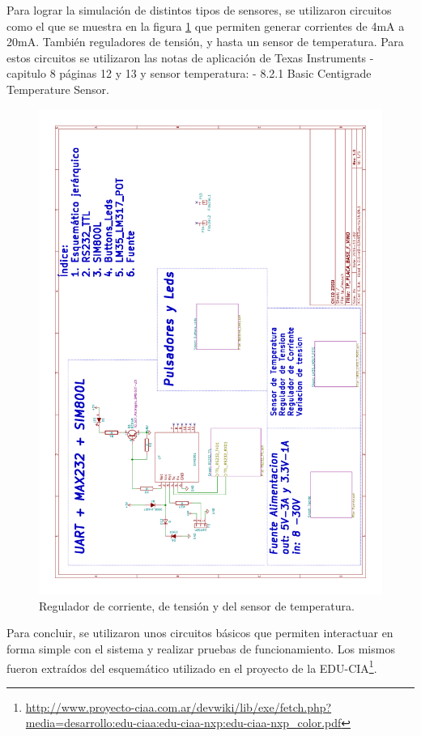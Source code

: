 Para lograr la simulación de distintos tipos de sensores, se utilizaron circuitos como el que se muestra en la figura \ref{fig:temp_tens}  que permiten generar corrientes de 4mA a 20mA. También reguladores de tensión, y hasta un sensor de temperatura. Para estos circuitos se utilizaron las notas de aplicación de Texas Instruments\citep{Texas:LM317} - capitulo 8 páginas 12 y 13 y sensor temperatura: \citep{Texas:LM35} - 8.2.1 Basic Centigrade Temperature Sensor. 
\begin{figure}[!hp]
  \centering
  \includegraphics[page=4,scale=0.6,angle=270,clip,trim=1cm 2cm 3.5cm 2.5cm]{./Figures/schematic.pdf}
  \caption{Regulador de corriente, de tensión y del sensor de temperatura.}
  \label{fig:temp_tens}
\end{figure}

Para concluir, se utilizaron unos circuitos básicos que permiten interactuar en forma simple con el sistema y realizar pruebas de funcionamiento. Los mismos fueron extraídos del esquemático utilizado en el proyecto de la EDU-CIA\footnote{\url{http://www.proyecto-ciaa.com.ar/devwiki/lib/exe/fetch.php?media=desarrollo:edu-ciaa:edu-ciaa-nxp:edu-ciaa-nxp\_color.pdf}}.


